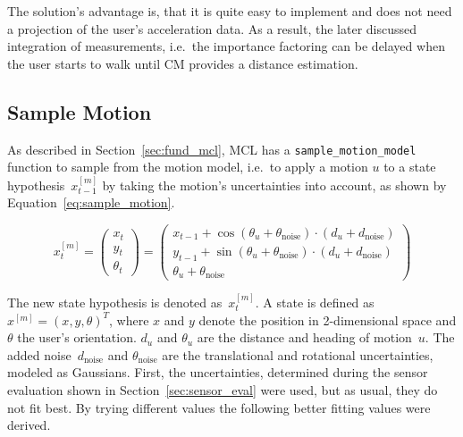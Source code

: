 The solution's advantage is, that it is quite easy to implement and does not need a projection of the user's acceleration data. As a result, the later discussed integration of measurements, i.e.\ the importance factoring can be delayed when the user starts to walk until \acs{CM} provides a distance estimation.
 


\subsection{Sample Motion}\label{sec:algo_sample_motion}
As described in Section~\ref{sec:fund_mcl}, \acs{MCL} has a \texttt{sample\_motion\_model} function to sample from the motion model, i.e.\ to apply a motion $u$ to a state hypothesis~$x^{[m]}_{t-1}$ by taking the motion's uncertainties into account, as shown by Equation~\ref{eq:sample_motion}.

\begin{equation}\label{eq:sample_motion}
	x^{[m]}_t = \left(
    \begin{array}{c}
      x_t\\
      y_t\\
      \theta_t
    \end{array}
  \right) = \left(\begin{array}{c} x_{t-1} + \cos(\theta_u + \theta_{\text{noise}})\cdot (d_u + d_\text{noise}) \\ y_{t-1} + \sin(\theta_u + \theta_{\text{noise}})\cdot (d_u + d_\text{noise}) \\ \theta_u + \theta_{\text{noise}}
    \end{array}
  \right)
\end{equation}

\noindent The new state hypothesis is denoted as~$x^{[m]}_t$. A state is defined as~$x^{[m]} = (x, y, \theta)^T$, where $x$ and $y$ denote the position in 2-dimensional space and $\theta$ the user's orientation. $d_u$ and $\theta_u$ are the distance and heading of motion~$u$. The added noise~$d_\text{noise}$ and $\theta_\text{noise}$ are the translational and rotational uncertainties, modeled as Gaussians. First, the uncertainties, determined during the sensor evaluation shown in Section~\ref{sec:sensor_eval} were used, but as usual, they do not fit best. By trying different values the following better fitting values were derived.

